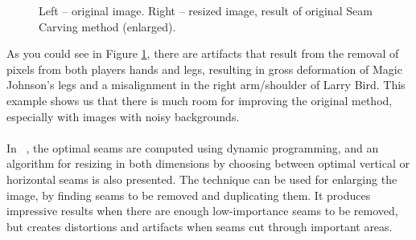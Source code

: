 \documentclass[conference]{acmsiggraph}
\begin{document}
\begin{figure}[ht]       
    \caption{Left -- original image. Right -- resized image, result of original Seam Carving method (enlarged). }
    \label{fig:orgSeamCarving}
\end{figure}


 As you could see in Figure \ref{fig:orgSeamCarving}, there are artifacts that result from the removal of  pixels from both players hands and legs, resulting in gross deformation of Magic Johnson's legs and a misalignment in the right arm/shoulder of Larry Bird. This example shows us that there is much room for improving the original method, especially with images with noisy backgrounds.  

\paragraph{}
In  ~\cite{Avidan2007}, the optimal seams are computed using dynamic programming, and an algorithm for resizing in both dimensions by choosing between optimal vertical or horizontal seams is also presented. The technique can be used for enlarging the image, by finding seams to be removed and duplicating them. It produces impressive results when there are enough low-importance seams to be removed, but creates distortions and artifacts when seams cut through important areas.
\end{document}
